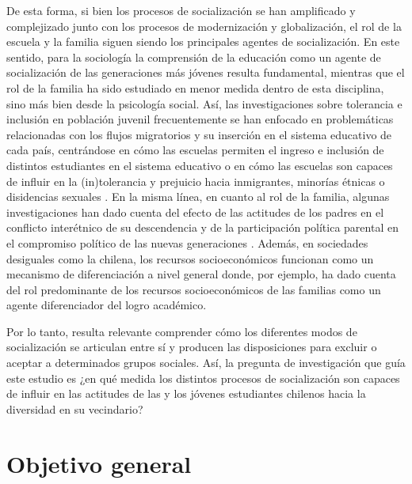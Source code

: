 \documentclass[12pt,twoside]{templates/facsothesis}
\begin{document}
De esta forma, si bien los procesos de socialización se han amplificado y complejizado junto con los procesos de modernización y globalización, el rol de la escuela y la familia siguen siendo los principales agentes de socialización. En este sentido, para la sociología la comprensión de la educación como un agente de socialización de las generaciones más jóvenes resulta fundamental, mientras que el rol de la familia ha sido estudiado en menor medida dentro de esta disciplina, sino más bien desde la psicología social. Así, las investigaciones sobre tolerancia e inclusión en población juvenil frecuentemente se han enfocado en problemáticas relacionadas con los flujos migratorios y su inserción en el sistema educativo de cada país, centrándose en cómo las escuelas permiten el ingreso e inclusión de distintos estudiantes en el sistema educativo \citep{bellei_estudio_2013, ortiz_Actitudes_2016, stefoni_Educacion_2016a} o en cómo las escuelas son capaces de influir en la (in)tolerancia y prejuicio hacia inmigrantes, minorías étnicas o disidencias sexuales \citep{lee_Tolerated_2014, maurissen_Classroom_2020, trevino_Influence_2018}. En la misma línea, en cuanto al rol de la familia, algunas investigaciones han dado cuenta del efecto de las actitudes de los padres en el conflicto interétnico de su descendencia \citep{medjedovic_intergroup_2021} y de la participación política parental en el compromiso político de las nuevas generaciones \citep{bacovsky_raising_2021}. Además, en sociedades desiguales como la chilena, los recursos socioeconómicos funcionan como un mecanismo de diferenciación a nivel general donde, por ejemplo, \citet{bellei_estudio_2013} ha dado cuenta del rol predominante de los recursos socioeconómicos de las familias como un agente diferenciador del logro académico.

Por lo tanto, resulta relevante comprender cómo los diferentes modos de socialización se articulan entre sí y producen las disposiciones para excluir o aceptar a determinados grupos sociales. Así, la pregunta de investigación que guía este estudio es ¿en qué medida los distintos procesos de socialización son capaces de influir en las actitudes de las y los jóvenes estudiantes chilenos hacia la diversidad en su vecindario?

\hypertarget{objetivo-general}{%
\section{Objetivo general}\label{objetivo-general}}
\end{document}
